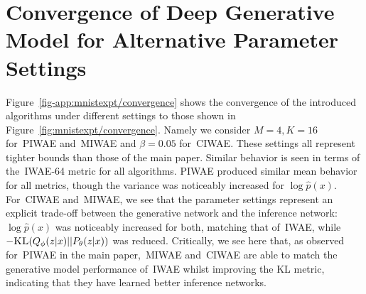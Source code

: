 
\section{Convergence of Deep Generative Model for Alternative Parameter Settings}
\label{sec:app:exp-algs}

Figure~\ref{fig-app:mnistexpt/convergence} shows the convergence of the introduced algorithms under different
settings to those shown in Figure~\ref{fig:mnistexpt/convergence}. Namely we consider $M=4, K=16$ for~\gls{PIWAE} and~\gls{MIWAE} 
and $\beta = 0.05$ for~\gls{CIWAE}.  These settings all represent tighter bounds than those of the main paper.
Similar behavior is seen in terms of the~\gls{IWAE}-64 metric for all algorithms.  \gls{PIWAE} produced
similar mean behavior for all metrics, though the variance was noticeably increased for $\log \hat{p}(x)$.
For~\gls{CIWAE} and~\gls{MIWAE}, we see that the parameter settings represent an explicit trade-off between
the generative network and the inference network:  $\log \hat{p}(x)$ was noticeably increased for both, matching
that of~\gls{IWAE}, while $-\textsc{KL}(Q_{\phi}(z \lvert x) || P_{\theta}(z \lvert x))$ was reduced.
Critically, we see here that, as observed for~\gls{PIWAE} in the main paper,~\gls{MIWAE} and~\gls{CIWAE} are able to
match the generative model performance of~\gls{IWAE} whilst improving the KL metric, indicating that they have learned
better inference networks.

